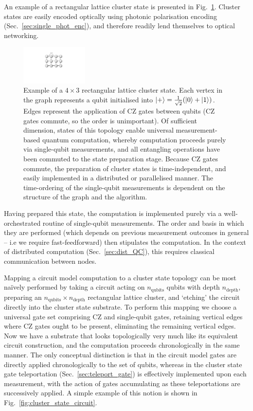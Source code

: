 An example of a rectangular lattice cluster state is presented in Fig.~\ref{fig:cluster_state}. Cluster states are easily encoded optically using photonic polarisation encoding (Sec.~\ref{sec:single_phot_enc}), and therefore readily lend themselves to optical networking.

\begin{figure}[!htb]
	\includegraphics[width=0.3\textwidth]{cluster_state}
	\caption{Example of a \mbox{$4\times 3$} rectangular lattice cluster state. Each vertex in the graph represents a qubit initialised into \mbox{$|+\rangle=\frac{1}{\sqrt{2}}(|0\rangle+|1\rangle)$}. Edges represent the application of CZ gates between qubits (CZ gates commute, so the order is unimportant). Of sufficient dimension, states of this topology enable universal measurement-based quantum computation, whereby computation proceeds purely via single-qubit measurements, and all entangling operations have been commuted to the state preparation stage. Because CZ gates commute, the preparation of cluster states is time-independent, and easily implemented in a distributed or parallelised manner. The time-ordering of the single-qubit measurements is dependent on the structure of the graph and the algorithm.} \label{fig:cluster_state}
\end{figure}

Having prepared this state, the computation is implemented purely via a well-orchestrated routine of single-qubit measurements. The order and basis in which they are performed (which depends on previous measurement outcomes in general -- i.e we require fast-feedforward) then stipulates the computation. In the context of distributed computation (Sec.~\ref{sec:dist_QC}), this requires classical communication between nodes.

Mapping a circuit model computation to a cluster state topology can be most na{\" i}vely performed by taking a circuit acting on $n_\text{qubits}$ qubits with depth $n_\text{depth}$, preparing an \mbox{$n_\text{qubits}\times n_\text{depth}$} rectangular lattice cluster, and `etching' the circuit directly into the cluster state substrate. To perform this mapping we choose a universal gate set comprising CZ and single-qubit gates, retaining vertical edges where CZ gates ought to be present, eliminating the remaining vertical edges. Now we have a substrate that looks topologically very much like its equivalent circuit construction, and the computation proceeds chronologically in the same manner. The only conceptual distinction is that in the circuit model gates are directly applied chronologically to the set of qubits, whereas in the cluster state gate teleportation (Sec.~\ref{sec:teleport_gate}) is effectively implemented upon each measurement, with the action of gates accumulating as these teleportations are successively applied. A simple example of this notion is shown in Fig.~\ref{fig:cluster_state_circuit}.

